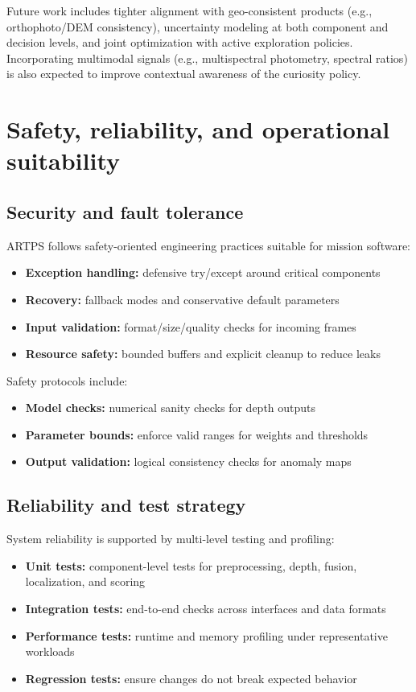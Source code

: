 \documentclass[12pt]{article}
\begin{document}
Future work includes tighter alignment with geo-consistent products (e.g., orthophoto/DEM consistency), uncertainty modeling at both component and decision levels, and joint optimization with active exploration policies. Incorporating multimodal signals (e.g., multispectral photometry, spectral ratios) is also expected to improve contextual awareness of the curiosity policy.

\section{Safety, reliability, and operational suitability}
\subsection{Security and fault tolerance}
ARTPS follows safety-oriented engineering practices suitable for mission software:

\begin{itemize}
\item \textbf{Exception handling:} defensive try/except around critical components
\item \textbf{Recovery:} fallback modes and conservative default parameters
\item \textbf{Input validation:} format/size/quality checks for incoming frames
\item \textbf{Resource safety:} bounded buffers and explicit cleanup to reduce leaks
\end{itemize}

Safety protocols include:
\begin{itemize}
\item \textbf{Model checks:} numerical sanity checks for depth outputs
\item \textbf{Parameter bounds:} enforce valid ranges for weights and thresholds
\item \textbf{Output validation:} logical consistency checks for anomaly maps
\end{itemize}

\subsection{Reliability and test strategy}
System reliability is supported by multi-level testing and profiling:
\begin{itemize}
\item \textbf{Unit tests:} component-level tests for preprocessing, depth, fusion, localization, and scoring
\item \textbf{Integration tests:} end-to-end checks across interfaces and data formats
\item \textbf{Performance tests:} runtime and memory profiling under representative workloads
\item \textbf{Regression tests:} ensure changes do not break expected behavior
\end{itemize}
\end{document}

